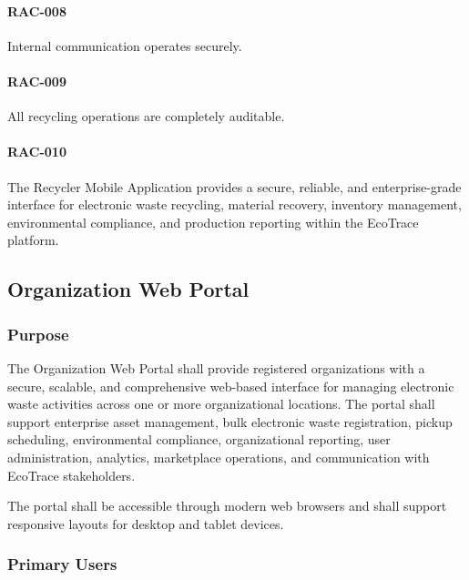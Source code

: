 \paragraph{RAC-008}

Internal communication operates securely.

\paragraph{RAC-009}

All recycling operations are completely auditable.

\paragraph{RAC-010}

The Recycler Mobile Application provides a secure, reliable, and
enterprise-grade interface for electronic waste recycling, material
recovery, inventory management, environmental compliance, and
production reporting within the EcoTrace platform.

\subsection{Organization Web Portal}

\subsubsection*{Purpose}

The Organization Web Portal shall provide registered organizations with
a secure, scalable, and comprehensive web-based interface for managing
electronic waste activities across one or more organizational locations.
The portal shall support enterprise asset management, bulk electronic
waste registration, pickup scheduling, environmental compliance,
organizational reporting, user administration, analytics, marketplace
operations, and communication with EcoTrace stakeholders.

The portal shall be accessible through modern web browsers and shall
support responsive layouts for desktop and tablet devices.


\subsubsection*{Primary Users}

